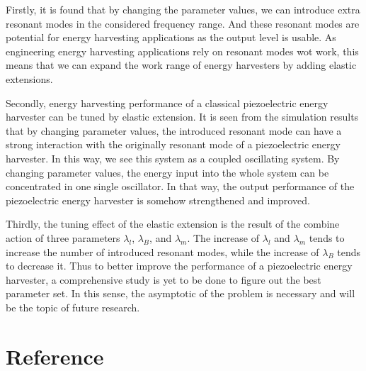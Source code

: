 \documentclass{elsarticle}
\begin{document}
Firstly, it is found that by changing the parameter values, we can introduce extra resonant modes in the considered frequency range. And these resonant modes are potential for energy harvesting applications as the output level is usable. As engineering energy harvesting applications rely on resonant modes wot work, this means that we can expand the work range of energy harvesters by adding elastic extensions.

Secondly, energy harvesting performance of a classical piezoelectric energy harvester can be tuned by elastic extension. It is seen from the simulation results that by changing parameter values, the introduced resonant mode can have a strong interaction with the originally resonant mode of a piezoelectric energy harvester. In this way, we see this system as a coupled oscillating system. By changing parameter values, the energy input into the whole system can be concentrated in one single oscillator. In that way, the output performance of the piezoelectric energy harvester is somehow strengthened and improved.

Thirdly, the tuning effect of the elastic extension is the result of the combine action of three parameters $\lambda_l$, $\lambda_B$, and $\lambda_m$. The increase of $\lambda_l$ and $\lambda_m$ tends to increase the number of introduced resonant modes, while the increase of $\lambda_B$ tends to decrease it. Thus to better improve the performance of a piezoelectric energy harvester, a comprehensive study is yet to be done to figure out the best parameter set. In this sense, the asymptotic of the problem is necessary and will be the topic of future research. 

\section*{Reference}



\end{document}
